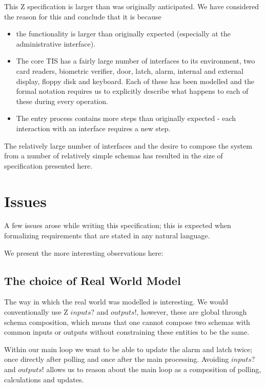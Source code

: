 This Z specification is larger than was originally anticipated. We
have considered the reason for this and conclude that it is because
\begin{itemize}
\item
the functionality is larger than originally expected (especially at
the administrative interface).
\item
The core TIS has a fairly large number of interfaces to its
environment, two card readers, biometric verifier, door, latch, alarm,
internal and external display, floppy disk and keyboard. Each of these
has been modelled and the formal notation requires us to explicitly
describe what happens to each of these during every operation.
\item
The entry process contains more steps than originally expected - each
interaction with an interface requires a new step.
\end{itemize}

The relatively large number of interfaces and the desire to compose
the system from a number of relatively 
simple schemas has resulted in the size of specification presented here.

\section{Issues}
A few issues arose while writing this specification; this is expected
when formalizing requirements that are stated in any natural language.

We present the more interesting observations here:

\subsection{The choice of Real World Model}
The way in which the real world was modelled is interesting. We would
conventionally  use Z $inputs?$ and $outputs!$, however, these are
global through schema composition, which means that one cannot compose
two schemas with common inputs or outputs without constraining these
entities to be the same. 

Within our main loop we want to be able to update the alarm and latch
twice; once directly after polling and once after the main
processing.
Avoiding $inputs?$ and $outputs!$ allows us to reason about the main loop as
a composition of polling, calculations and updates.

